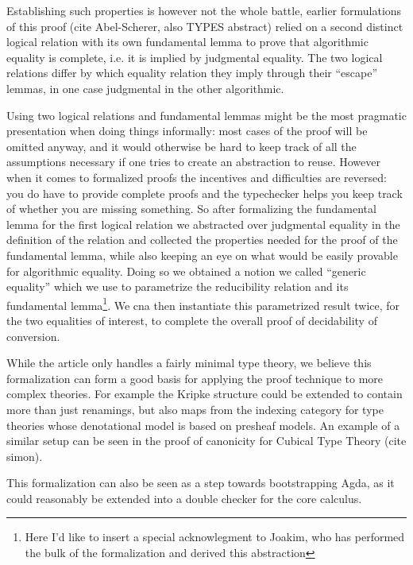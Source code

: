 \documentclass{book}
\begin{document}
Establishing such properties is however not the whole battle, earlier
formulations of this proof (cite Abel-Scherer, also TYPES abstract)
relied on a second distinct logical relation with its own fundamental
lemma to prove that algorithmic equality is complete, i.e. it is
implied by judgmental equality. The two logical relations differ by
which equality relation they imply through their ``escape'' lemmas, in one
case judgmental in the other algorithmic.

Using two logical relations and fundamental lemmas might be the most
pragmatic presentation when doing things informally: most cases of the
proof will be omitted anyway, and it would otherwise be hard to keep
track of all the assumptions necessary if one tries to create an
abstraction to reuse. However when it comes to formalized proofs the
incentives and difficulties are reversed: you do have to provide
complete proofs and the typechecker helps you keep track of whether
you are missing something. So after formalizing the fundamental lemma
for the first logical relation we abstracted over judgmental equality
in the definition of the relation and collected the properties needed
for the proof of the fundamental lemma, while also keeping an eye on
what would be easily provable for algorithmic equality.  Doing so we
obtained a notion we called ``generic equality'' which we use to
parametrize the reducibility relation and its fundamental
lemma\footnote{Here I'd like to insert a special acknowlegment to
  Joakim, who has performed the bulk of the formalization and derived
  this abstraction}. We cna then instantiate this parametrized result
twice, for the two equalities of interest, to complete the overall
proof of decidability of conversion.


While the article only handles a fairly minimal type theory, we
believe this formalization can form a good basis for applying the
proof technique to more complex theories. For example the Kripke
structure could be extended to contain more than just renamings, but
also maps from the indexing category for type theories whose
denotational model is based on presheaf models. An example of a
similar setup can be seen in the proof of canonicity for Cubical Type
Theory (cite simon).

This formalization can also be seen as a step towards bootstrapping
Agda, as it could reasonably be extended into a double checker for the
core calculus.
\end{document}
